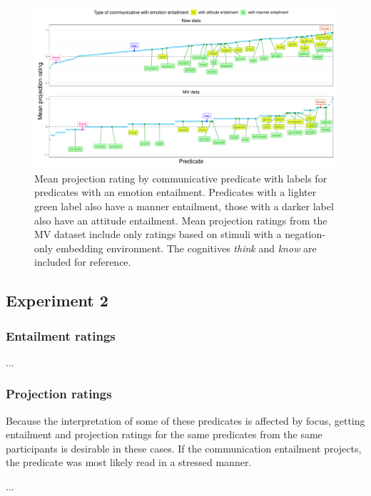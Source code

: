 \documentclass[11pt,fleqn]{article}
\newcommand{\6}{\mbox{$[\hspace*{-.6mm}[$}}
\newcommand{\9}{\mbox{$]\hspace*{-.6mm}]$}}
\begin{document}
\begin{figure}[H]
	\centering
	\includegraphics[width=1\textwidth]{projection-by-communicative-emoComms-manner-attitude-comparison}
	\caption{Mean projection rating by communicative predicate with labels for predicates with an emotion entailment. Predicates with a lighter green label also have a manner entailment, those with a darker label also have an attitude entailment. Mean projection ratings from the MV dataset include only ratings based on stimuli with a negation-only embedding environment. The cognitives \emph{think} and \emph{know} are included for reference.}
	\label{projlabemotypes}
\end{figure}



\subsection{Experiment 2}
\subsubsection{Entailment ratings}

...

\subsubsection{Projection ratings}

Because the interpretation of some of these predicates is affected by focus, getting entailment and projection ratings for the same predicates from the same participants is desirable in these cases. If the communication entailment projects, the predicate was most likely read in a stressed manner.

...


\pagebreak



\end{document}
